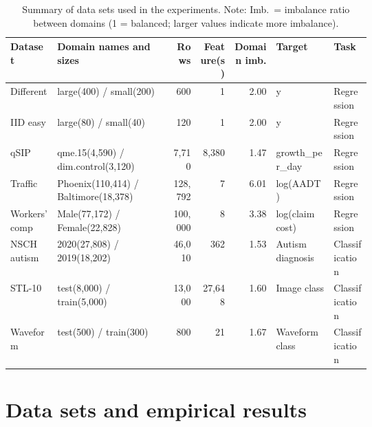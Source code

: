 \documentclass[twoside]{article}
\begin{document}
\begin{table}[t]
\centering
\scriptsize
\setlength{\tabcolsep}{2pt}
\caption{Summary of data sets used in the experiments. Note: Imb.\ = imbalance ratio between domains (1 = balanced; larger values indicate more imbalance).}
\label{tab:dataset-summary}
\begin{tabular}{p{0.13\linewidth}p{0.32\linewidth}rrrp{0.16\linewidth}l}
\toprule
\textbf{Dataset} & \textbf{Domain names and sizes} & \textbf{Rows} & \textbf{Feature(s)} & \textbf{Domain imb.} & \textbf{Target} & \textbf{Task} \\
\midrule
Different & large(400) / small(200) & 600 & 1 & 2.00 & y & Regression \\
IID easy & large(80) / small(40) & 120 & 1 & 2.00 & y & Regression \\
\midrule
qSIP &  qme.15(4,590) / dim.control(3,120) & 7,710 & 8,380 & 1.47 & growth\_per\_day & Regression \\
Traffic & Phoenix(110,414) / Baltimore(18,378) & 128,792 & 7 & 6.01 & log(AADT) & Regression \\
Workers' comp & Male(77,172) / Female(22,828) & 100,000 & 8 & 3.38 & log(claim cost) & Regression \\
\midrule
NSCH autism & 2020(27,808) / 2019(18,202) & 46,010 & 362 & 1.53 & Autism diagnosis & Classification \\
STL-10 & test(8,000) / train(5,000) & 13,000 & 27,648 & 1.60 & Image class & Classification \\
Waveform & test(500) / train(300) & 800 & 21 & 1.67 & Waveform class & Classification \\
\bottomrule
\end{tabular}
\end{table}

\section{Data sets and empirical results}
\label{sec:experiments-results}
\end{document}
